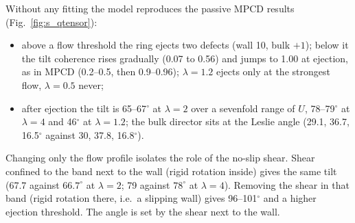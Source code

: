 \documentclass[aps,prl,onecolumn,superscriptaddress,amsmath,amssymb,nofootinbib]{revtex4-2}
\begin{document}
Without any fitting the model reproduces the passive MPCD results (Fig.~\ref{fig:s_qtensor}):
\begin{itemize}
\item above a flow threshold the ring ejects two defects (wall 10, bulk $+1$); below it the tilt coherence rises gradually (0.07 to 0.56) and jumps to 1.00 at ejection, as in MPCD
(0.2--0.5, then 0.9--0.96); $\lambda=1.2$ ejects only at the strongest flow, $\lambda=0.5$ never;
\item after ejection the tilt is 65--67$^\circ$ at $\lambda=2$ over a sevenfold range of $U$, 78--79$^\circ$ at $\lambda=4$ and 46$^\circ$ at $\lambda=1.2$; the bulk director sits at
the Leslie angle (29.1, 36.7, 16.5$^\circ$ against 30, 37.8, 16.8$^\circ$).
\end{itemize}
Changing only the flow profile isolates the role of the no-slip shear. Shear confined to the band next to the wall (rigid rotation inside) gives the same tilt (67.7 against
$66.7^\circ$ at $\lambda=2$; 79 against $78^\circ$ at $\lambda=4$). Removing the shear in that band (rigid rotation there, i.e.\ a slipping wall) gives 96--101$^\circ$ and a higher
ejection threshold. The angle is set by the shear next to the wall.
\end{document}
